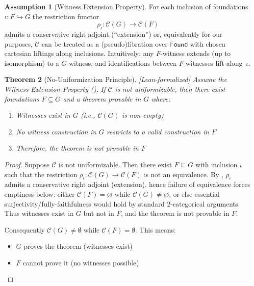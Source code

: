 \documentclass[11pt]{article}
\theoremstyle{plain}
\newtheorem{theorem}{Theorem}[section]
\theoremstyle{definition}
\newtheorem{assumption}[theorem]{Assumption}
\newcommand{\Found}{\mathsf{Found}}
\newcommand{\leanok}{\textsf{\textcolor{green!70!black}{[Lean-formalized]}}}
\begin{document}
\begin{assumption}[Witness Extension Property]\label{assump:WEP}
For each inclusion of foundations $\iota:F\hookrightarrow G$ the restriction functor
\[
  \rho_{\iota}:\mathcal C(G)\longrightarrow \mathcal C(F)
\]
admits a conservative right adjoint (``extension'') or, equivalently for our purposes, $\mathcal C$ can be treated as a (pseudo)fibration over $\Found$ with chosen cartesian liftings along inclusions. Intuitively: any $F$-witness extends (up to isomorphism) to a $G$-witness, and identifications between $F$-witnesses lift along~$\iota$.
\end{assumption}

\begin{theorem}[No-Uniformization Principle]\label{thm:no-unif} \leanok
Assume the Witness Extension Property (). 
If $\mathcal{C}$ is not uniformizable, then there exist foundations $F \subseteq G$ and a theorem provable in $G$ where:
\begin{enumerate}
\item Witnesses exist in $G$ (i.e., $\mathcal{C}(G)$ is non-empty)
\item No witness construction in $G$ restricts to a valid construction in $F$
\item Therefore, the theorem is not provable in $F$
\end{enumerate}
\end{theorem}

\begin{proof}
Suppose $\mathcal{C}$ is not uniformizable. Then there exist $F \subseteq G$ with inclusion $\iota$ such that the restriction $\rho_\iota:\mathcal{C}(G) \to \mathcal{C}(F)$ is not an equivalence. By , $\rho_\iota$ admits a conservative right adjoint (extension), hence failure of equivalence forces emptiness below: either $\mathcal{C}(F)=\varnothing$ while $\mathcal{C}(G)\neq\varnothing$, or else essential surjectivity/fully-faithfulness would hold by standard 2-categorical arguments. Thus witnesses exist in $G$ but not in $F$, and the theorem is not provable in $F$.

Consequently $\mathcal{C}(G) \neq \emptyset$ while $\mathcal{C}(F) = \emptyset$. This means:
\begin{itemize}
\item $G$ proves the theorem (witnesses exist)
\item $F$ cannot prove it (no witnesses possible)
\end{itemize}
\end{proof}
\end{document}
